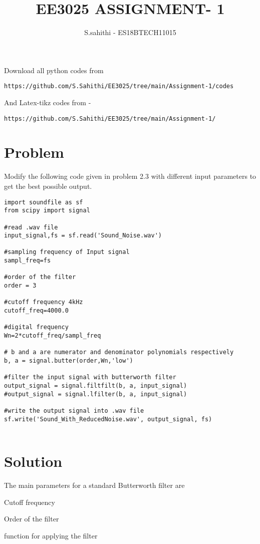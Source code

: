 \documentclass[journal,12pt,twocolumn]{IEEEtran}
\begin{document}
     \def\rightbox#1{\makebox[0in][r]{#1}}
     \def\centbox#1{\makebox[0in]{#1}}
     \def\topbox#1{\raisebox{-\baselineskip}[0in][0in]{#1}}
     \def\midbox#1{\raisebox{-0.5\baselineskip}[0in][0in]{#1}}
\vspace{3cm}
\title{EE3025 ASSIGNMENT- 1}
\author{S.sahithi - ES18BTECH11015}
\maketitle
\newpage
\bigskip
\renewcommand{\thefigure}{\theenumi}
\renewcommand{\thetable}{\theenumi}
Download all python codes from 
\begin{lstlisting}
https://github.com/S.Sahithi/EE3025/tree/main/Assignment-1/codes
\end{lstlisting}
And Latex-tikz codes from - 
\begin{lstlisting}
https://github.com/S.Sahithi/EE3025/tree/main/Assignment-1/
\end{lstlisting}
%
\section{\textbf{Problem}}
    
Modify the following code given in problem 2.3 with different input parameters to get the best possible output.
\begin{lstlisting}
import soundfile as sf
from scipy import signal
    
#read .wav file
input_signal,fs = sf.read('Sound_Noise.wav')
    
#sampling frequency of Input signal
sampl_freq=fs
    
#order of the filter
order = 3
    
#cutoff frequency 4kHz
cutoff_freq=4000.0
    
#digital frequency
Wn=2*cutoff_freq/sampl_freq
    
# b and a are numerator and denominator polynomials respectively
b, a = signal.butter(order,Wn,'low')
    
#filter the input signal with butterworth filter
output_signal = signal.filtfilt(b, a, input_signal)
#output_signal = signal.lfilter(b, a, input_signal)
    
#write the output signal into .wav file
sf.write('Sound_With_ReducedNoise.wav', output_signal, fs)
    
\end{lstlisting}
  \section{\textbf{Solution}}
  The main parameters for a standard Butterworth filter are
  \begin{description}[font=$\bullet$\scshape\bfseries]
  \item[]{Cutoff frequency}
  \item[]{Order of the filter}
  \item[]{function for applying the filter}
  \end{description}
  
\end{document}
